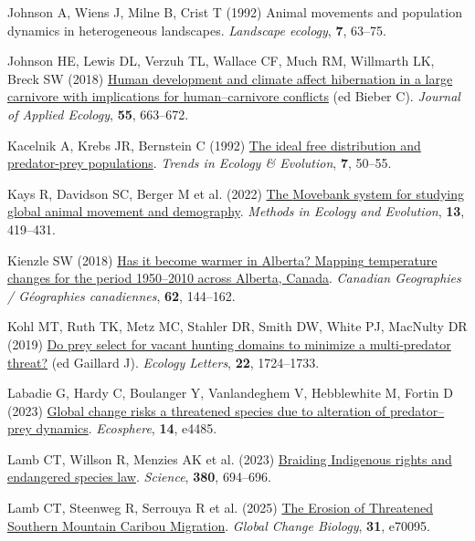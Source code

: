 \documentclass[
  12pt,
]{article}
\newlength{\cslhangindent}
\newenvironment{CSLReferences}[2] %
 {\begin{list}{}{%
  \setlength{\itemindent}{0pt}
  \setlength{\leftmargin}{0pt}
  \setlength{\parsep}{0pt}
  \ifodd #1
   \setlength{\leftmargin}{\cslhangindent}
   \setlength{\itemindent}{-1\cslhangindent}
  \fi
  \setlength{\itemsep}{#2\baselineskip}}}
 {\end{list}}
\begin{document}
\begin{CSLReferences}{1}{0}
Johnson A, Wiens J, Milne B, Crist T (1992) Animal movements and population dynamics in heterogeneous landscapes. \emph{Landscape ecology}, \textbf{7}, 63--75.

Johnson HE, Lewis DL, Verzuh TL, Wallace CF, Much RM, Willmarth LK, Breck SW (2018) \href{https://doi.org/10.1111/1365-2664.13021}{Human development and climate affect hibernation in a large carnivore with implications for human--carnivore conflicts} (ed Bieber C). \emph{Journal of Applied Ecology}, \textbf{55}, 663--672.

Kacelnik A, Krebs JR, Bernstein C (1992) \href{https://doi.org/10.1016/0169-5347(92)90106-L}{The ideal free distribution and predator-prey populations}. \emph{Trends in Ecology \& Evolution}, \textbf{7}, 50--55.

Kays R, Davidson SC, Berger M et al. (2022) \href{https://doi.org/10.1111/2041-210X.13767}{The {Movebank} system for studying global animal movement and demography}. \emph{Methods in Ecology and Evolution}, \textbf{13}, 419--431.

Kienzle SW (2018) \href{https://doi.org/10.1111/cag.12432}{Has it become warmer in {Alberta}? {Mapping} temperature changes for the period 1950--2010 across {Alberta}, {Canada}}. \emph{Canadian Geographies / Géographies canadiennes}, \textbf{62}, 144--162.

Kohl MT, Ruth TK, Metz MC, Stahler DR, Smith DW, White PJ, MacNulty DR (2019) \href{https://doi.org/10.1111/ele.13319}{Do prey select for vacant hunting domains to minimize a multi‐predator threat?} (ed Gaillard J). \emph{Ecology Letters}, \textbf{22}, 1724--1733.

Labadie G, Hardy C, Boulanger Y, Vanlandeghem V, Hebblewhite M, Fortin D (2023) \href{https://doi.org/10.1002/ecs2.4485}{Global change risks a threatened species due to alteration of predator--prey dynamics}. \emph{Ecosphere}, \textbf{14}, e4485.

Lamb CT, Willson R, Menzies AK et al. (2023) \href{https://doi.org/10.1126/science.adg9830}{Braiding {Indigenous} rights and endangered species law}. \emph{Science}, \textbf{380}, 694--696.

Lamb CT, Steenweg R, Serrouya R et al. (2025) \href{https://doi.org/10.1111/gcb.70095}{The {Erosion} of {Threatened} {Southern} {Mountain} {Caribou} {Migration}}. \emph{Global Change Biology}, \textbf{31}, e70095.


\end{CSLReferences}
\end{document}
